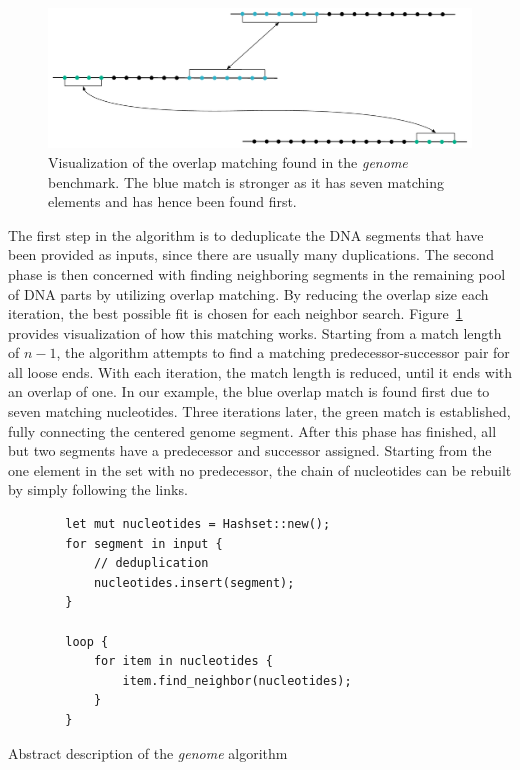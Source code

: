 \begin{figure}
    \includegraphics[width=\textwidth,keepaspectratio]{gfx/experiments-genome}
    \caption{Visualization of the overlap matching found in the \emph{genome} benchmark. The blue match is stronger as it has seven matching elements and has hence been found first.}
    \label{fig:experiments:genome-example}
\end{figure}

The first step in the algorithm is to deduplicate the DNA segments that have been provided as inputs, since there are usually many duplications.
The second phase is then concerned with finding neighboring segments in the remaining pool of DNA parts by utilizing overlap matching.
By reducing the overlap size each iteration, the best possible fit is chosen for each neighbor search.
Figure~\ref{fig:experiments:genome-example} provides visualization of how this matching works.
Starting from a match length of $n-1$, the algorithm attempts to find a matching predecessor-successor pair for all loose ends.
With each iteration, the match length is reduced, until it ends with an overlap of one.
In our example, the blue overlap match is found first due to seven matching nucleotides.
Three iterations later, the green match is established, fully connecting the centered genome segment.
After this phase has finished, all but two segments have a predecessor and successor assigned.
Starting from the one element in the set with no predecessor, the chain of nucleotides can be rebuilt by simply following the links.

\begin{listing}
    \begin{verbatim}
        let mut nucleotides = Hashset::new();
        for segment in input {
            // deduplication
            nucleotides.insert(segment);
        }

        loop {
            for item in nucleotides {
                item.find_neighbor(nucleotides);
            }
        }
    \end{verbatim}
    \caption{Abstract description of the \emph{genome} algorithm}
    \label{fig:experiments:opportunities:algos:genome}
\end{listing}

